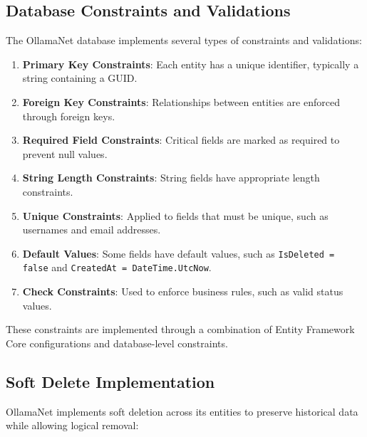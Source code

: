\subsection{Database Constraints and Validations}

The OllamaNet database implements several types of constraints and validations:

\begin{enumerate}
   \item \textbf{Primary Key Constraints}: Each entity has a unique identifier, typically a string containing a GUID.

   \item \textbf{Foreign Key Constraints}: Relationships between entities are enforced through foreign keys.

   \item \textbf{Required Field Constraints}: Critical fields are marked as required to prevent null values.

   \item \textbf{String Length Constraints}: String fields have appropriate length constraints.

   \item \textbf{Unique Constraints}: Applied to fields that must be unique, such as usernames and email addresses.

   \item \textbf{Default Values}: Some fields have default values, such as \texttt{IsDeleted = false} and \texttt{CreatedAt = DateTime.UtcNow}.

   \item \textbf{Check Constraints}: Used to enforce business rules, such as valid status values.
\end{enumerate}

These constraints are implemented through a combination of Entity Framework Core configurations and database-level constraints.

\subsection{Soft Delete Implementation}

OllamaNet implements soft deletion across its entities to preserve historical data while allowing logical removal:

